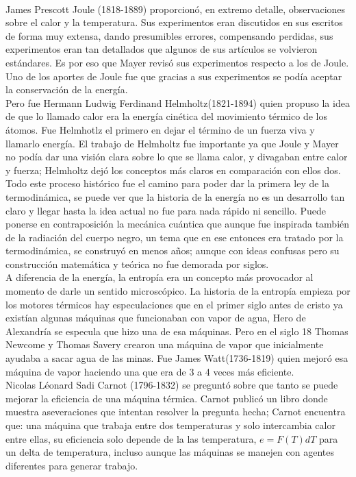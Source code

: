 \\
James Prescott Joule (1818-1889) proporcionó, en extremo detalle, observaciones sobre el calor y la temperatura. Sus experimentos eran discutidos en sus escritos de forma muy extensa, dando presumibles errores, compensando perdidas, sus experimentos eran tan detallados que algunos de sus artículos se volvieron estándares. Es por eso que Mayer revisó sus experimentos respecto a los de Joule. Uno de los aportes de Joule fue que gracias a sus experimentos se podía aceptar la conservación de la energía. 
\\
Pero fue Hermann Ludwig Ferdinand Helmholtz(1821-1894) quien propuso la idea de que lo llamado calor era la energía cinética del movimiento térmico de los átomos. Fue Helmhotlz el primero en dejar el término de un fuerza viva y llamarlo energía. El trabajo de Helmholtz fue importante ya que Joule y  Mayer no podía dar una visión clara sobre lo que se llama calor, y divagaban entre calor y fuerza; Helmholtz dejó los conceptos más claros en comparación con ellos dos. 
\\
Todo este proceso histórico fue el camino para poder dar la primera ley de la termodinámica, se puede ver que la historia de la energía no es un desarrollo tan claro y llegar hasta la idea actual no fue para nada rápido ni sencillo. Puede ponerse en contraposición la mecánica cuántica que aunque fue inspirada también de la radiación del cuerpo negro, un tema que en ese entonces era tratado por la termodinámica, se construyó en menos años; aunque con ideas confusas pero su construcción matemática y teórica no fue demorada por siglos. 
\\
A diferencia de la energía, la entropía era un concepto más provocador al momento de darle un sentido microscópico. La historia de la  entropía empieza por los motores térmicos hay especulaciones que en el primer siglo antes de cristo ya existían algunas máquinas que funcionaban con vapor de agua, Hero de Alexandría se especula que hizo una de esa máquinas. Pero en el siglo 18 Thomas Newcome y Thomas Savery crearon una máquina de vapor que inicialmente ayudaba a sacar agua de las minas. Fue James Watt(1736-1819) quien mejoró esa máquina de vapor haciendo una que era de 3 a 4 veces más eficiente.
\\
Nicolas Léonard Sadi Carnot (1796-1832) se preguntó sobre que tanto se puede mejorar la eficiencia de una máquina térmica. Carnot publicó un libro donde muestra aseveraciones que intentan resolver la pregunta hecha; Carnot encuentra que: una máquina que trabaja entre dos temperaturas y solo intercambia calor entre ellas, su eficiencia solo depende de la  las temperatura, $e=F(T)dT$ para un delta de temperatura, incluso aunque las máquinas se manejen con agentes diferentes para generar trabajo. 
